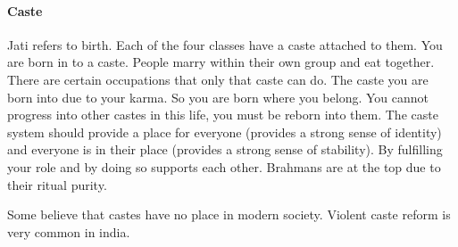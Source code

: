 \documentclass{article}
\begin{document}
\paragraph{Caste}
\label{par:caste}
Jati refers to birth. Each of the four classes have a caste attached to them. You are born in to a caste. People marry within their own group and eat together. There are certain occupations that only that caste can do. The caste you are born into due to your karma. So you are born where you belong. You cannot progress into other castes in this life, you must be reborn into them. The caste system should provide a place for everyone (provides a strong sense of identity) and everyone is in their place (provides a strong sense of stability). By fulfilling your role and by doing so supports each other. Brahmans are at the top due to their ritual purity.

Some believe that castes have no place in modern society. Violent caste reform is very common in india.
\end{document}
